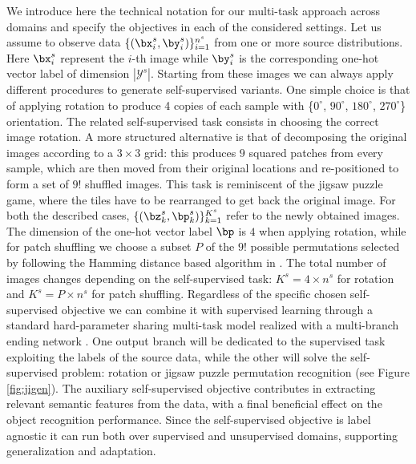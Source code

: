 We introduce here the technical notation for our multi-task approach across domains and specify the objectives in each of the considered settings. 
Let us assume to observe data $\{(\bx_i^s,\by_i^s)\}_{i=1}^{n^s}$ from one or more source distributions. 
Here $\bx_i^s$ represent the $i$-th image while 
$\by_i^s$ is the corresponding one-hot vector label of dimension $|\mathcal{Y}^s|$.
Starting from these images we can always apply different procedures to generate self-supervised variants. One simple choice is that of applying rotation to produce 4 copies of each sample with \{$0^\circ$, $90^\circ$, $180^\circ$, $270^\circ$\} orientation. The related self-supervised task consists in choosing the correct image rotation. 
A more structured alternative is that of decomposing the original images according to a $3\times 3$ grid: this produces $9$ squared patches from every sample, which are then moved from their original locations and re-positioned to form a set of $9!$ shuffled images. {This task is reminiscent of the jigsaw puzzle game}, where the tiles have to be rearranged to get back the original image.
For both the described cases,  $\{(\bz_k^s,\bp_k^s)\}_{k=1}^{K^s}$ refer to the newly obtained images. The dimension of the one-hot vector label $\bp$ is $4$ when applying rotation, while for patch shuffling we choose a subset $P$ of the $9!$ possible permutations selected by following the Hamming distance based algorithm in \cite{NorooziF16}. The total number of images changes depending on the self-supervised task:  $K^s=4\times n^s$ for rotation and  $K^s=P\times n^s$ for patch shuffling.
Regardless of the specific chosen self-supervised objective we can combine it with supervised learning through a 
standard hard-parameter sharing 
multi-task model realized with a multi-branch ending network  \cite{Caruana:1997}. One output branch will be dedicated to the supervised task exploiting the labels of the source data, while the other will solve the self-supervised problem: rotation or jigsaw puzzle permutation recognition (see Figure \ref{fig:jigen}). 
{The auxiliary self-supervised objective contributes in extracting relevant semantic features from the data, with a final beneficial effect on the object recognition performance. 
Since the self-supervised objective is label agnostic it can run both over supervised and unsupervised domains, supporting generalization and adaptation.
}


